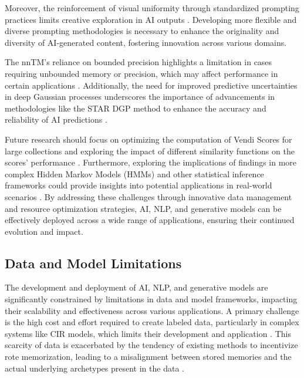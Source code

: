 Moreover, the reinforcement of visual uniformity through standardized prompting practices limits creative exploration in AI outputs \cite{palmini2024patternscreativityuserinput}. Developing more flexible and diverse prompting methodologies is necessary to enhance the originality and diversity of AI-generated content, fostering innovation across various domains.



The nnTM's reliance on bounded precision highlights a limitation in cases requiring unbounded memory or precision, which may affect performance in certain applications \cite{stogin2022provablystableneuralnetwork}. Additionally, the need for improved predictive uncertainties in deep Gaussian processes underscores the importance of advancements in methodologies like the STAR DGP method to enhance the accuracy and reliability of AI predictions \cite{lindinger2020meanfieldstructureddeepgaussian}.



Future research should focus on optimizing the computation of Vendi Scores for large collections and exploring the impact of different similarity functions on the scores' performance \cite{pasarkar2024cousinsvendiscorefamily}. Furthermore, exploring the implications of findings in more complex Hidden Markov Models (HMMs) and other statistical inference frameworks could provide insights into potential applications in real-world scenarios \cite{lathouwers2017memorypaysdiscordhidden}. By addressing these challenges through innovative data management and resource optimization strategies, AI, NLP, and generative models can be effectively deployed across a wide range of applications, ensuring their continued evolution and impact.



\subsection{Data and Model Limitations} \label{subsec:Data and Model Limitations}



The development and deployment of AI, NLP, and generative models are significantly constrained by limitations in data and model frameworks, impacting their scalability and effectiveness across various applications. A primary challenge is the high cost and effort required to create labeled data, particularly in complex systems like CIR models, which limits their development and application \cite{jang2024visualdeltageneratorlarge}. This scarcity of data is exacerbated by the tendency of existing methods to incentivize rote memorization, leading to a misalignment between stored memories and the actual underlying archetypes present in the data \cite{abudy2023minimumdescriptionlengthhopfield}.



